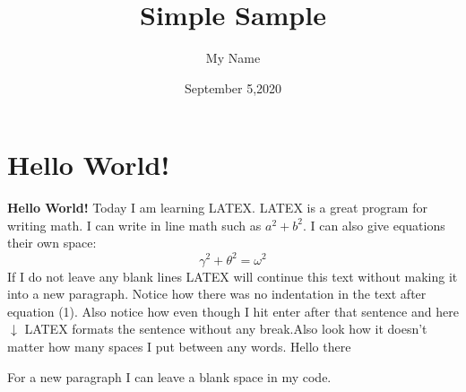 \documentclass[10 pt]{article}
\begin{document}
\title{Simple Sample}
\author{My Name}
\date{September 5,2020}
\maketitle
\section{Hello World!}
\textbf{Hello World!}
Today I am learning {\Large L}A{\Large T}E{\Large X}. LATEX is a great program for writing math. I can write in line math such as $a^2+b^2$. I can also give equations their own space:
\begin{equation}
\gamma^2+\theta^2=\omega^2
\end{equation}
If I do not leave any blank lines LATEX will continue this text without making it into a new paragraph. Notice how there was no indentation in the text after equation (1). Also notice how even though I hit enter after that sentence and here $\downarrow$ LATEX formats the sentence without any break.Also look how it doesn't
matter how many spaces I put between any words.  Hello there

For a new paragraph I can leave a blank space in my code.
\end{document}
